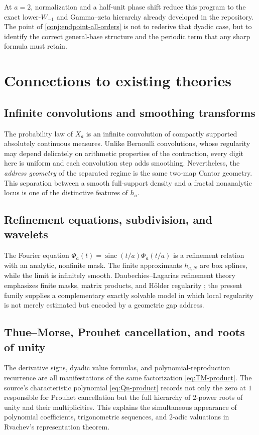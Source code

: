 \documentclass[11pt,oneside]{article}
\theoremstyle{definition}
\theoremstyle{remark}
\newcommand{\sinc}{\operatorname{sinc}}
\begin{document}
At $a=2$, normalization and a half-unit phase shift reduce this program to the exact
lower-$W_{-1}$ and Gamma--zeta hierarchy already developed in the repository.  The point of
\cref{conj:endpoint-all-orders} is not to rederive that dyadic case, but to identify the
correct general-base structure and the periodic term that any sharp formula must retain.

\section{Connections to existing theories}
\label{sec:connections}

\subsection{Infinite convolutions and smoothing transforms}

The probability law of $X_a$ is an infinite convolution of compactly supported absolutely
continuous measures.  Unlike Bernoulli convolutions, whose regularity may depend delicately on
arithmetic properties of the contraction, every digit here is uniform and each convolution
step adds smoothing.  Nevertheless, the \emph{address geometry} of the separated regime is
the same two-map Cantor geometry.  This separation between a smooth full-support density and
a fractal nonanalytic locus is one of the distinctive features of $h_a$.

\subsection{Refinement equations, subdivision, and wavelets}

The Fourier equation
$\Phi_a(t)=\sinc(t/a)\Phi_a(t/a)$ is a refinement relation with an analytic, nonfinite mask.
The finite approximants $h_{a,N}$ are box splines, while the limit is infinitely smooth.
Daubechies--Lagarias refinement theory emphasizes finite masks, matrix products, and Hölder
regularity \cite{daubechieslagarias1,daubechieslagarias2}; the present family supplies a
complementary exactly solvable model in which local regularity is not merely estimated but
encoded by a geometric gap address.

\subsection{Thue--Morse, Prouhet cancellation, and roots of unity}

The derivative signs, dyadic value formulas, and polynomial-reproduction recurrence are all
manifestations of the same factorization \eqref{eq:TM-product}.  The source's characteristic
polynomial \eqref{eq:Qn-product} records not only the zero at $1$ responsible for Prouhet
cancellation but the full hierarchy of $2$-power roots of unity and their multiplicities.
This explains the simultaneous appearance of polynomial coefficients, trigonometric
sequences, and $2$-adic valuations in Rvachev's representation theorem.
\end{document}
